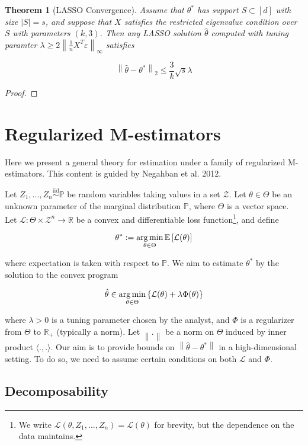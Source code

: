\documentclass{article}
\newcommand{\R}{\mathbb{R}}
\newcommand{\bbP}{\mathbb{P}}
\newcommand{\cL}{\mathcal{L}}
\newcommand{\cZ}{\mathcal{Z}}
\newcommand{\argmin}{\mathop{\rm arg\,min}}
\newcommand{\ev}[1]{\mathbb{E}\left[#1\right]}
\newcommand{\iid}{\overset{\textrm{iid}}{\sim}}
\newcommand{\norm}[1]{\left\|#1\right\|}
\newcommand{\ip}[2]{\langle #1, #2 \rangle}
\newcommand{\eps}{\varepsilon} %
\newtheorem{theorem}{Theorem}
\begin{document}
\begin{theorem}[LASSO Convergence]
  Assume that $\theta^{*}$ has support $S \subset [d]$ with size $|S| = s$, and suppose that $X$ satisfies the restricted eigenvalue condition over $S$ with parameters $(k, 3)$. Then any LASSO solution $\hat{\theta}$ computed with tuning paramter $\lambda \geq 2\norm{\frac1n X^{T}\eps}_{\infty}$ satisfies

  $$\norm{\hat{\theta} - \theta^{*}}_{2} \leq \frac{3}{k}\sqrt{s}\lambda$$
\end{theorem}

\begin{proof}

 \end{proof}

\section{Regularized M-estimators}

Here we present a general theory for estimation under a family of regularized M-estimators. This content is guided by Negahban et al. 2012.

Let $Z_{1}, ..., Z_{n} \iid \bbP$ be random variables taking values in a set $\cZ$. Let $\theta \in \Theta$ be an unknown parameter of the marginal distribution $\bbP$, where $\Theta$ is a vector space. Let $\cL : \Theta \times \cZ^{n} \rightarrow \R$ be a convex and differentiable loss function\footnote{We write $\cL(\theta, Z_{1}, ..., Z_{n}) = \cL(\theta)$ for brevity, but the dependence on the data maintains.}, and define

$$\theta^{*} := \argmin_{\theta \in \Theta}\ev{\cL(\theta)}$$

where expectation is taken with respect to $\bbP$. We aim to estimate $\theta^{*}$ by the solution to the convex program

$$\hat{\theta} \in \argmin_{\theta \in \Theta}\left\{\cL(\theta) + \lambda\Phi(\theta)\right\}$$

where $\lambda > 0$ is a tuning parameter chosen by the analyst, and $\Phi$ is a regularizer from $\Theta$ to $\R_{+}$ (typically a norm). Let $\norm{.}$ be a norm on $\Theta$ induced by inner product $\ip{.}{.}$. Our aim is to provide bounds on $\norm{\hat{\theta} - \theta^{*}}$ in a high-dimensional setting. To do so, we need to assume certain conditions on both $\cL$ and $\Phi$.

\subsection{Decomposability}
\end{document}
